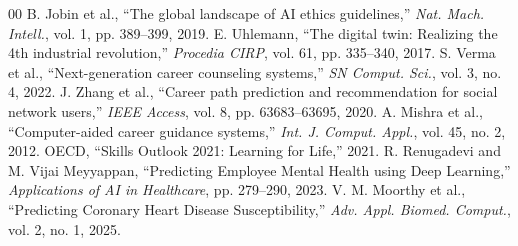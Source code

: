 \documentclass[conference]{IEEEtran}
\begin{document}
\begin{thebibliography}{00}
 B. Jobin et al., ``The global landscape of AI ethics guidelines,'' \textit{Nat. Mach. Intell.}, vol. 1, pp. 389--399, 2019.
 E. Uhlemann, ``The digital twin: Realizing the 4th industrial revolution,'' \textit{Procedia CIRP}, vol. 61, pp. 335--340, 2017.
 S. Verma et al., ``Next-generation career counseling systems,'' \textit{SN Comput. Sci.}, vol. 3, no. 4, 2022.
 J. Zhang et al., ``Career path prediction and recommendation for social network users,'' \textit{IEEE Access}, vol. 8, pp. 63683--63695, 2020.
 A. Mishra et al., ``Computer-aided career guidance systems,'' \textit{Int. J. Comput. Appl.}, vol. 45, no. 2, 2012.
 OECD, ``Skills Outlook 2021: Learning for Life,'' 2021.
 R. Renugadevi and M. Vijai Meyyappan, ``Predicting Employee Mental Health using Deep Learning,'' \textit{Applications of AI in Healthcare}, pp. 279--290, 2023.
 V. M. Moorthy et al., ``Predicting Coronary Heart Disease Susceptibility,'' \textit{Adv. Appl. Biomed. Comput.}, vol. 2, no. 1, 2025.
\end{thebibliography}
\end{document}
